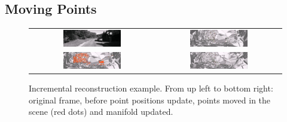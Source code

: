 \subsection{Moving Points}


\begin{figure}[t]
\centering
\begin{tabular}{cc}
\includegraphics[width = 0.48\textwidth]{./img//ExRec_cropped}&
\includegraphics[width = 0.48\textwidth]{./img//ExRec01_cropped}\\
\includegraphics[width = 0.48\textwidth]{./img//ExRec02_cropped}&
\includegraphics[width = 0.48\textwidth]{./img//ExRec05}\\
\end{tabular}
\caption{Incremental reconstruction example. From up left to bottom right: original frame, before point positions update, points moved in the scene (red dots) and  manifold updated.}
\label{fig:exampleFr}
\end{figure}




